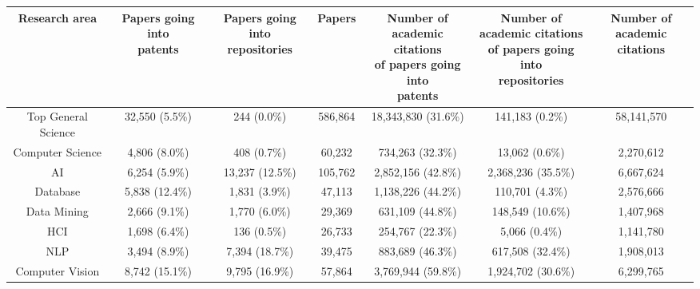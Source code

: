 \begin{tabular}{c|ccc|ccc}
\toprule
Research area & \makecell{Papers going into \\ patents} & \makecell{Papers going into \\ repositories} &   Papers & \makecell{Number of \\academic citations \\  of papers going into \\ patents} & \makecell{Number of \\academic citations \\  of papers going into \\ repositories} & \makecell{Number of \\academic citations} \\
\midrule
Top General Science & 32,550 (5.5\%) & 244 (0.0\%) & 586,864 & 18,343,830 (31.6\%) & 141,183 (0.2\%) & 58,141,570 \\
Computer Science & 4,806 (8.0\%) & 408 (0.7\%) & 60,232 & 734,263 (32.3\%) & 13,062 (0.6\%) & 2,270,612 \\
\hdashline
AI & 6,254 (5.9\%) & 13,237 (12.5\%) & 105,762 & 2,852,156 (42.8\%) & 2,368,236 (35.5\%) & 6,667,624 \\
Database & 5,838 (12.4\%) & 1,831 (3.9\%) & 47,113 & 1,138,226 (44.2\%) & 110,701 (4.3\%) & 2,576,666 \\
Data Mining & 2,666 (9.1\%) & 1,770 (6.0\%) & 29,369 & 631,109 (44.8\%) & 148,549 (10.6\%) & 1,407,968 \\
HCI & 1,698 (6.4\%) & 136 (0.5\%) & 26,733 & 254,767 (22.3\%) & 5,066 (0.4\%) & 1,141,780 \\
NLP & 3,494 (8.9\%) & 7,394 (18.7\%) & 39,475 & 883,689 (46.3\%) & 617,508 (32.4\%) & 1,908,013 \\
Computer Vision & 8,742 (15.1\%) & 9,795 (16.9\%) & 57,864 & 3,769,944 (59.8\%) & 1,924,702 (30.6\%) & 6,299,765 \\
\bottomrule
\end{tabular}